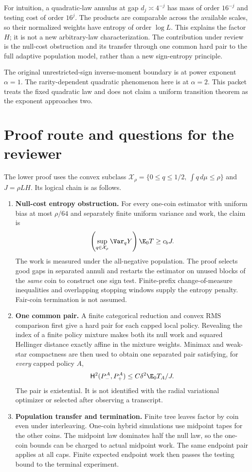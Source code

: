 For intuition, a quadratic-law annulus at gap $d_j\asymp4^{-j}$ has mass
of order $16^{-j}$ and testing cost of order $16^j$. The products are
comparable across the available scales, so their normalized weights have
entropy of order $\log L$. This explains the factor $H$; it is not a new
arbitrary-law characterization. The contribution under review is the
null-cost obstruction and its transfer through one common hard pair to
the full adaptive population model, rather than a new sign-entropy principle.

The original unrestricted-sign inverse-moment boundary is at power exponent
$\alpha=1$. The rarity-dependent quadratic phenomenon here is at
$\alpha=2$. This packet treats the fixed quadratic law and does not claim
a uniform transition theorem as the exponent approaches two.

\clearpage
\section*{Proof route and questions for the reviewer}

The lower proof uses the convex subclass
$\mathcal X_\rho=\{0\le q\le1/2,\ \int q\,d\mu\le\rho\}$ and
$J=\rho LH$. Its logical chain is as follows.

\begin{enumerate}
\item \textbf{Null-cost entropy obstruction.} For every one-coin estimator
with uniform bias at most $\rho/64$ and separately finite uniform variance
and work, the claim is
\[
 \left(\sup_{q\in\mathcal X_\rho}\Var_qY\right)\E_0T\ge c_bJ.
\]
The work is measured under the all-negative population. The proof selects
good gaps in separated annuli and restarts the estimator on unused blocks
of the \emph{same} coin to construct one sign test. Finite-prefix
change-of-measure inequalities and overlapping stopping windows supply the
entropy penalty. Fair-coin termination is not assumed.

\item \textbf{One common pair.} A finite categorical reduction and convex
RMS comparison first give a hard pair for each capped local policy.
Revealing the index of a finite policy mixture makes both its null work
and squared Hellinger distance exactly affine in the mixture weights.
Minimax and weak-star compactness are then used to obtain one separated
pair satisfying, for \emph{every} capped policy $A$,
\[
 \mathsf H^2(P^A_-,P^A_+)\le C\delta^2\E_0T_A/J.
\]
The pair is existential. It is not identified with the radial variational
optimizer or selected after observing a transcript.

\item \textbf{Population transfer and termination.} Finite tree leaves
factor by coin even under interleaving. One-coin hybrid simulations use
midpoint tapes for the other coins. The midpoint law dominates half the
null law, so the one-coin bounds can be charged to actual midpoint work.
The same endpoint pair applies at all caps. Finite expected endpoint work
then passes the testing bound to the terminal experiment.
\end{enumerate}

